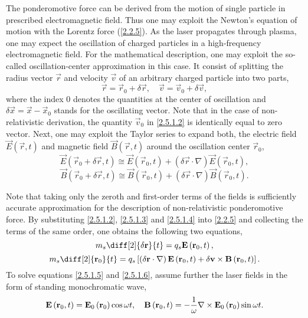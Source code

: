 The ponderomotive force can be derived from the motion of single particle in prescribed electromagnetic field. Thus one may exploit the Newton's equation of motion with the Lorentz force (\ref{2.2.5}). As the laser propagates through plasma, one may expect the oscillation of charged particles in a high-frequency electromagnetic field. For the mathematical description, one may exploit the so-called oscillation-center approximation in this case. It consist of splitting the radius vector $ \vec{r} $ and velocity $ \vec{v} $ of an arbitrary charged particle into two parts,
\begin{equation}
\label{2.5.1.2}
\vec{r} = \vec{r}_0 + \delta \vec{r}, \quad \vec{v} = \vec{v}_0 + \delta \vec{v},
\end{equation}
where the index $ 0 $ denotes the quantities at the center of oscillation and $ \delta \vec{x} = \vec{x} - \vec{x}_0 $ stands for the oscillating vector. Note that in the case of non-relativistic derivation, the quantity $ \vec{v}_0 $ in \ref{2.5.1.2} is identically equal to zero vector. Next, one may exploit the Taylor series to  expand both, the electric field $ \vec{E}\left(\vec{r}, t\right) $ and magnetic field $ \vec{B}\left(\vec{r}, t\right) $ around the oscillation center $ \vec{r}_0 $,
\begin{equation}
\label{2.5.1.3}
\vec{E}\left(\vec{r}_0 + \delta \vec{r}, t\right) \cong \vec{E}\left(\vec{r}_0, t\right) + \left(\delta \vec{r} \cdot \nabla \right) \vec{E}\left(\vec{r}_0, t\right),
\end{equation}
\begin{equation}
\label{2.5.1.4}
\vec{B}\left(\vec{r}_0 + \delta \vec{r}, t\right) \cong \vec{B}\left(\vec{r}_0, t\right) + \left(\delta \vec{r} \cdot \nabla \right) \vec{B}\left(\vec{r}_0, t\right).
\end{equation}

Note that taking only the zeroth and first-order terms of the fields is sufficiently accurate approximation for the description of non-relativistic ponderomotive force. By substituting \ref{2.5.1.2}, \ref{2.5.1.3} and \ref{2.5.1.4} into \ref{2.2.5} and collecting the terms of the same order, one obtains the following two equations, 
\begin{equation}
\label{2.5.1.5}
m_s \diff[2]{\delta \vec{r}}{t} = q_s \vec{E}\left(\vec{r}_0, t\right),
\end{equation}
\begin{equation}
\label{2.5.1.6}
m_s \diff[2]{\vec{r}_0}{t} = q_s \left[\left(\delta \vec{r} \cdot \nabla \right) \vec{E}\left(\vec{r}_0, t\right) + \delta \vec{v} \times \vec{B}\left(\vec{r}_0, t\right) \right]. 
\end{equation}
To solve equations \ref{2.5.1.5} and \ref{2.5.1.6}, assume further the laser fields in the form of standing monochromatic wave, 
\begin{equation}
\label{2.5.1.7}
\mathbf{E}\left(\mathbf{r}_0, t\right) = \mathbf{E}_0 \left(\mathbf{r}_0 \right) \cos \omega t, \quad  \mathbf{B}\left(\mathbf{r}_0, t\right) = - \frac{1}{\omega} \nabla \times \mathbf{E}_0 \left(\mathbf{r}_0 \right) \sin \omega t.
\end{equation}

